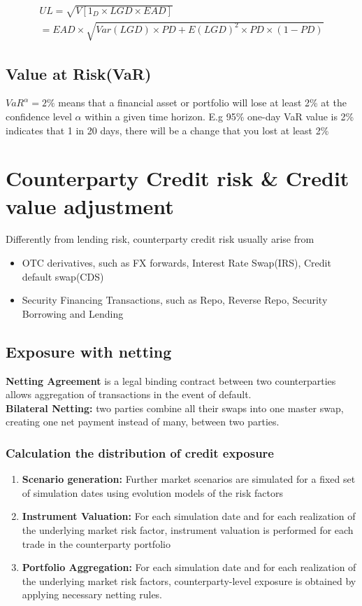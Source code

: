\documentclass{article}
\theoremstyle{definition}
\theoremstyle{thrm}
\theoremstyle{lma}
\theoremstyle{ppst}
\theoremstyle{crlr}
\begin{document}
\begin{align*}
	UL = \sqrt{V[1_D \times LGD \times EAD]}\\
	= EAD\times \sqrt{Var(LGD)\times PD + E(LGD)^2\times PD \times(1-PD)}
\end{align*}

\subsection{Value at Risk(VaR)}
$VaR^\alpha = 2\%$ means that a financial asset or portfolio will lose at least 2\% at the confidence level $\alpha$ within a given time horizon. E.g 95\% one-day VaR value is 2\% indicates that 1 in 20 days, there will be a change that you lost at least 2\%

\section{Counterparty Credit risk \& Credit value adjustment}
Differently from lending risk, counterparty credit risk usually arise from 
\begin{itemize}
	\item OTC derivatives, such as FX forwards, Interest Rate Swap(IRS), Credit default swap(CDS)
	\item Security Financing Transactions, such as Repo, Reverse Repo, Security Borrowing and Lending
\end{itemize}
\subsection{Exposure with netting}
\textbf{Netting Agreement} is a legal binding contract between two counterparties allows aggregation of transactions in the event of default.\\
\textbf{Bilateral Netting: } two parties combine all their swaps into one master swap, creating one net payment instead of many, between two parties. 
\subsubsection{Calculation the distribution of credit exposure}
\begin{enumerate}
	\item \textbf{Scenario generation:} Further market scenarios are simulated for a fixed set of simulation dates using evolution models of the risk factors
	\item \textbf{Instrument Valuation: } For each simulation date and for each realization of the underlying market risk factor, instrument valuation is performed for each trade in the counterparty portfolio
	\item \textbf{Portfolio Aggregation: }For each simulation date and for each realization of the underlying market risk factors, counterparty-level exposure is obtained by applying necessary netting rules. 
\end{enumerate}
\end{document}
